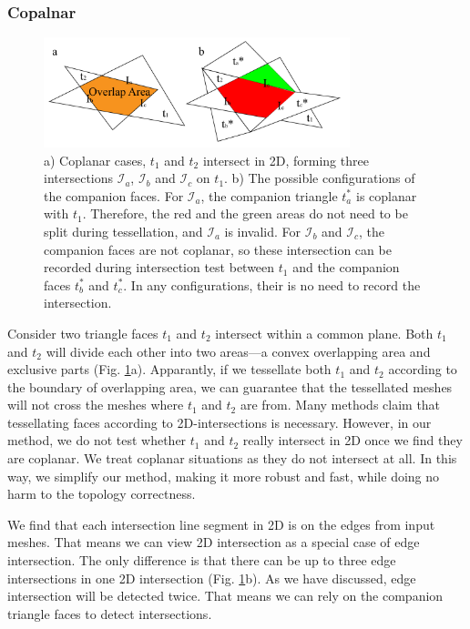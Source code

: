 \documentclass[10pt,journal,compsoc]{IEEEtran}
\begin{document}
\subsubsection{Copalnar}

\begin{figure}[t]
\centering
\includegraphics[width=3.5in]{coplanar}
\caption{a) Coplanar cases, $t_1$ and $t_2$ intersect in 2D, forming three intersections $\mathcal{I}_a$, $\mathcal{I}_b$ and $\mathcal{I}_c$ on $t_1$. b) The possible configurations of the companion faces. For $\mathcal{I}_a$, the companion triangle $t_a^*$ is coplanar with $t_1$. Therefore, the red and the green areas do not need to be split during tessellation, and $\mathcal{I}_a$ is invalid. For $\mathcal{I}_b$ and $\mathcal{I}_c$, the companion faces are not coplanar, so these intersection can be recorded during intersection test between $t_1$ and the companion faces $t_b^*$ and $t_c^*$. In any configurations, their is no need to record the intersection.}
\label{fig:coplanar}
\end{figure}

Consider two triangle faces $t_1$ and $t_2$ intersect within a common plane. Both $t_1$ and $t_2$ will divide each other into two areas---a convex overlapping area and exclusive parts (Fig. \ref{fig:coplanar}a). Apparantly, if we tessellate both $t_1$ and $t_2$ according to the boundary of overlapping area, we can guarantee that the tessellated meshes will not cross the meshes where $t_1$ and $t_2$ are from. Many methods \cite{feito2013fast,zhou2016mesh} claim that tessellating faces according to 2D-intersections is necessary. However, in our method, we do not test whether $t_1$ and $t_2$ really intersect in 2D once we find they are coplanar. We treat coplanar situations as they do not intersect at all. In this way, we simplify our method, making it more robust and fast, while doing no harm to the topology correctness.

We find that each intersection line segment in 2D is on the edges from input meshes. That means we can view 2D intersection as a special case of edge intersection. The only difference is that there can be up to three edge intersections in one 2D intersection (Fig. \ref{fig:coplanar}b). As we have discussed, edge intersection will be detected twice. That means we can rely on the companion triangle faces to detect intersections.
\end{document}
